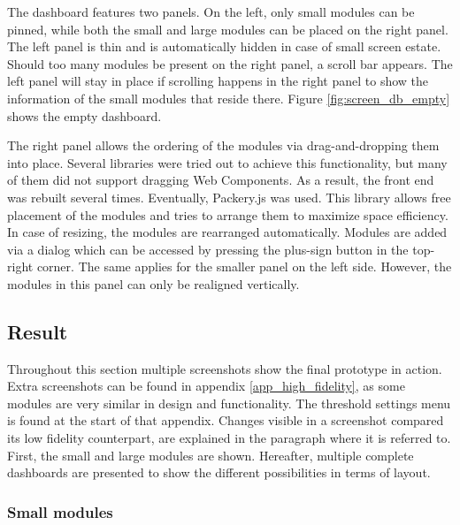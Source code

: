         The dashboard features two panels. On the left, only small modules can be pinned, while both the small and large modules can be placed on the right panel. The left panel is thin and is automatically hidden in case of small screen estate. Should too many modules be present on the right panel, a scroll bar appears. The left panel will stay in place if scrolling happens in the right panel to show the information of the small modules that reside there. Figure \ref{fig:screen_db_empty} shows the empty dashboard.

        The right panel allows the ordering of the modules via drag-and-dropping them into place. Several libraries were tried out to achieve this functionality, but many of them did not support dragging Web Components. As a result, the front end was rebuilt several times. Eventually, Packery.js was used. This library allows free placement of the modules and tries to arrange them to maximize space efficiency. In case of resizing, the modules are rearranged automatically. Modules are added via a dialog which can be accessed by pressing the plus-sign button in the top-right corner. The same applies for the smaller panel on the left side. However, the modules in this panel can only be realigned vertically.

    \subsection{Result}

    Throughout this section multiple screenshots show the final prototype in action. Extra screenshots can be found in appendix \ref{app_high_fidelity}, as some modules are very similar in design and functionality. The threshold settings menu is found at the start of that appendix. Changes visible in a screenshot compared its low fidelity counterpart, are explained in the paragraph where it is referred to. First, the small and large modules are shown. Hereafter, multiple complete dashboards are presented to show the different possibilities in terms of layout.

        \subsubsection{Small modules}

